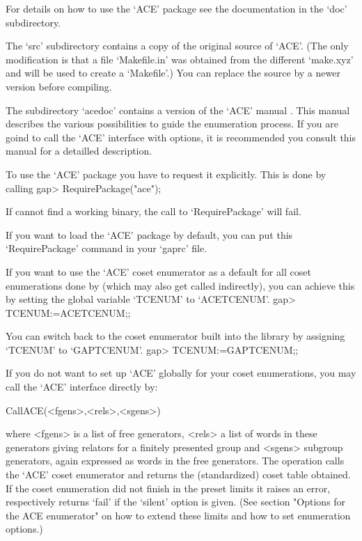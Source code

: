 For details on how to use the `ACE' package see the documentation in the
`doc' subdirectory.

The `src' subdirectory contains a copy of the original source of `ACE'. (The
only modification is that a file `Makefile.in' was obtained from the different
`make.xyz' and will be used to create a `Makefile'.)
You can replace the source by a newer version before compiling.

The subdirectory `acedoc' contains a version of the `ACE' manual
\cite{aceman}. This
manual describes the various possibilities to guide the enumeration process.
If you are goind to call the `ACE' interface with options, it is recommended
you consult this manual for a detailled description.


To use the `ACE' package you have to request it explicitly. This is done by
calling 
\begintt
gap> RequirePackage("ace");
\endtt

If {\GAP} cannot find a working binary, the call to `RequirePackage' will
fail.

If you want to load the `ACE' package by default, you can put this
`RequirePackage' command in your `gaprc' file.

If you want to use the `ACE' coset enumerator as a default for all coset
enumerations done by {\GAP} (which may also get called indirectly), you can 
achieve this by setting the global variable `TCENUM' to `ACETCENUM'.
\begintt
gap> TCENUM:=ACETCENUM;;
\endtt

You
can switch back to the coset enumerator built into the {\GAP} library by
assigning `TCENUM' to `GAPTCENUM'.
\begintt
gap> TCENUM:=GAPTCENUM;;
\endtt



If you do not want to set up `ACE' globally for your coset enumerations,
you may call the `ACE' interface directly by:

\>CallACE(<fgens>,<rels>,<sgens>)

where <fgens> is a list of free generators, <rels> a list of words in these
generators giving relators for a finitely presented group and <sgens>
subgroup generators, again expressed as words in the free generators. The
operation calls the `ACE' coset enumerator and returns the (standardized)
coset table obtained. If the coset enumeration did not finish in the preset
limits it raises an error, respectively returns `fail' if the `silent'
option is given.
(See section "Options for the ACE enumerator" on how to extend these
limits and how to set enumeration options.)

